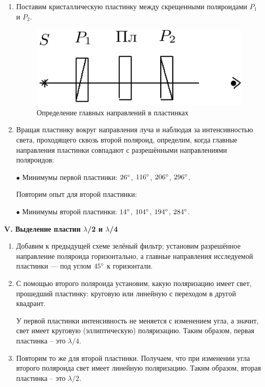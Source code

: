 \documentclass[a4paper,12pt]{article} %
\begin{document}
	\begin{enumerate}
		\item Поставим кристаллическую пластинку между скрещенными поляроидами $P_1$ и $P_2$.
		
		\begin{figure}[h!]
			\centering
			\includegraphics[scale=0.5]{Pictures/IV}
			\caption{Определение главных направлений в пластинках}
		\end{figure}
		
		\item Вращая пластинку вокруг направления луча и наблюдая за интенсивностью света, проходящего сквозь второй поляроид, определим, когда главные направления пластинки совпадают с разрешёнными направлениями поляроидов:
		
		\begin{center}
			$\bullet$ Минимумы первой пластинки: $26\degree$, $116\degree$, $206\degree$, $296\degree$.
		\end{center} 
		
		Повторим опыт для второй пластинки:
		
		\begin{center}
			$\bullet$ Минимумы второй пластинки: $14\degree$, $104\degree$, $194\degree$, $284\degree$.
		\end{center}
	\end{enumerate}


	\begin{center}
		\textbf{V. Выделение пластин $\lambda$/2 и $\lambda$/4}
	\end{center}

	\begin{enumerate}
		\item Добавим к предыдущей схеме зелёный фильтр; установим разрешённое направление поляроида горизонтально, а главные направления исследуемой пластинки — под углом $45\degree$ к горизонтали.
		
		\item С помощью второго поляроида установим, какую поляризацию имеет свет, прошедший пластинку: круговую или линейную с переходом в другой квадрант.
		
		У первой пластинки интенсивность не меняется с изменением угла, а значит, свет имеет круговую (эллиптическую)
		поляризацию. Таким образом, первая пластинка -- это $\lambda / 4$.
		
		\item Повторим то же для второй пластинки. Получаем, что при изменении угла второго поляроида свет имеет линейную поляризацию. Таким образом, вторая пластинка -- это $\lambda / 2$.
	\end{enumerate}
\end{document}
